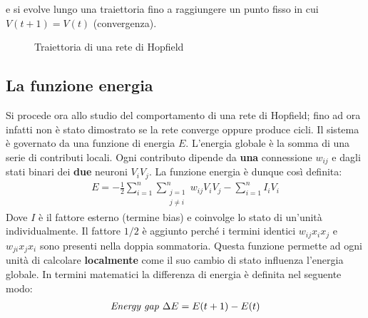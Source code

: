 e si evolve lungo una traiettoria fino a raggiungere un punto fisso in cui $V(t+1) = V(t)$ (convergenza).
\begin{figure}[h!]
	\centering
	\caption{Traiettoria di una rete di Hopfield}
\end{figure}

\subsection{La funzione energia} %
\label{sub:funzione_energia}
Si procede ora allo studio del comportamento di una rete di Hopfield; fino ad ora infatti non è stato dimostrato se la rete converge oppure produce cicli. Il sistema è governato da una funzione di energia $E$. L'energia globale è la somma di una serie di contributi locali. Ogni contributo dipende da \textbf{una} connessione $w_{ij}$ e dagli stati binari dei \textbf{due} neuroni $V_i V_j$. La funzione energia è dunque così definita:
\begin{align}
	E = - \frac{1}{2} \sum_{i=1}^n \sum_{\substack{j=1 \\ j \neq i}}^n w_{ij} V_i V_j - \sum_{i=1}^n I_i V_i\label{eq:energy}
\end{align}
Dove $I$ è il fattore esterno (termine bias) e coinvolge lo stato di un'unità individualmente. Il fattore $1 / 2$ è aggiunto perché i termini identici $w_{ij}x_i x_j$ e $w_{ji} x_j x_i$ sono presenti nella doppia sommatoria. Questa funzione permette ad ogni unità di calcolare \textbf{localmente} come il suo cambio di stato influenza l'energia globale. In termini matematici la differenza di energia è definita nel seguente modo:
\begin{align}
	\emph{Energy gap }\Delta E = E(t + 1) - E(t)
\end{align}

\newpage

